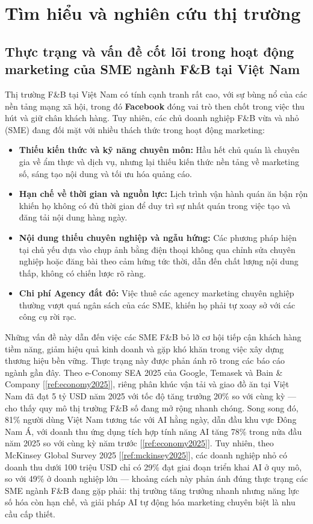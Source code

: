 \chapter{Tìm hiểu và nghiên cứu thị trường}\label{chap:thị-truong}

\section{Thực trạng và vấn đề cốt lõi trong hoạt động marketing của
SME ngành F\&B tại Việt Nam}\label{sec:thuc-trang}

Thị trường F\&B tại Việt Nam có tính cạnh tranh rất cao, với sự bùng nổ
của các nền tảng mạng xã hội, trong đó \textbf{Facebook} đóng vai trò
then chốt trong việc thu hút và giữ chân khách hàng. Tuy nhiên, các chủ
doanh nghiệp F\&B vừa và nhỏ (SME) đang đối mặt với nhiều thách thức
trong hoạt động marketing:

\begin{itemize}
\item
  \textbf{Thiếu kiến thức và kỹ năng chuyên môn:} Hầu hết chủ quán là
  chuyên gia về ẩm thực và dịch vụ, nhưng lại thiếu kiến thức nền tảng
  về marketing số, sáng tạo nội dung và tối ưu hóa quảng cáo.
\item
  \textbf{Hạn chế về thời gian và nguồn lực:} Lịch trình vận hành quán
  ăn bận rộn khiến họ không có đủ thời gian để duy trì sự nhất quán
  trong việc tạo và đăng tải nội dung hàng ngày.
\item
  \textbf{Nội dung thiếu chuyên nghiệp và ngẫu hứng:} Các phương pháp
  hiện tại chủ yếu dựa vào chụp ảnh bằng điện thoại không qua chỉnh sửa
  chuyên nghiệp hoặc đăng bài theo cảm hứng tức thời, dẫn đến chất lượng
  nội dung thấp, không có chiến lược rõ ràng.
\item
  \textbf{Chi phí Agency đắt đỏ:} Việc thuê các agency marketing chuyên
  nghiệp thường vượt quá ngân sách của các SME, khiến họ phải tự xoay sở
  với các công cụ rời rạc.
\end{itemize}

Những vấn đề này dẫn đến việc các SME F\&B bỏ lỡ cơ hội tiếp cận khách
hàng tiềm năng, giảm hiệu quả kinh doanh và gặp khó khăn trong việc xây
dựng thương hiệu bền vững. Thực trạng này được phản ánh rõ trong các báo
cáo ngành gần đây. Theo
e-Conomy SEA 2025 của Google, Temasek và Bain \& Company
[\ref{ref:economy2025}], riêng phân khúc vận tải và giao đồ ăn tại Việt Nam
đã đạt 5 tỷ USD năm 2025 với tốc độ tăng trưởng 20\% so với cùng kỳ ---
cho thấy quy mô thị trường F\&B số đang mở rộng nhanh chóng. Song song
đó, 81\% người dùng Việt Nam tương tác với AI hằng ngày, dẫn đầu khu
vực Đông Nam Á, với doanh thu ứng dụng tích hợp tính năng AI tăng 78\%
trong nửa đầu năm 2025 so với cùng kỳ năm trước [\ref{ref:economy2025}]. Tuy
nhiên, theo McKinsey Global Survey 2025 [\ref{ref:mckinsey2025}], các doanh
nghiệp nhỏ có doanh thu dưới 100 triệu USD chỉ có 29\% đạt giai đoạn
triển khai AI ở quy mô, so với 49\% ở doanh nghiệp lớn --- khoảng cách
này phản ánh đúng thực trạng các SME ngành F\&B đang gặp phải: thị
trường tăng trưởng nhanh nhưng năng lực số hóa còn hạn chế, và giải pháp
AI tự động hóa marketing chuyên biệt là nhu cầu cấp thiết.

